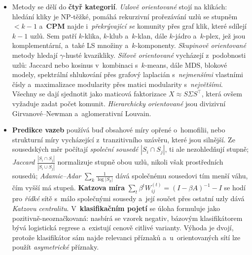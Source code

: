 \documentclass[11pt,a4paper]{article}
\theoremstyle{definition}
\begin{document}
\begin{itemize}
      lokální přesuny, pak stažení do supergrafu, celkem za $O(n\log n)$. Nevýhodou je citlivost
      na pořadí zpracování, možné \emph{nesouvislé komunity} a~uváznutí v~lokálních optimech.
      \textbf{Leiden} proto přidává fázi \emph{upřesnění rozdělení}, pořád ale dává jen tvrdé
      rozdělení. Otevřenou výzvou zůstává neznámý počet komunit a~heterogenní velikosti
      a~hustoty.
\item Metody se dělí do \textbf{čtyř kategorií}. \emph{Uzlově orientované} stojí na klikách:
      hledání kliky je NP-těžké, pomáhá rekurzivní prořezávání uzlů se stupněm $<k-1$
      a~\textbf{CPM} najde i~\emph{překrývající se} komunity přes graf klik, které sdílejí $k-1$
      uzlů. Sem patří $k$-klika, $k$-klub a~$k$-klan, dále $k$-jádro a~$k$-plex, jež jsou
      komplementární, a~také LS množiny a~$k$-komponenty. \emph{Skupinově orientované} metody
      hledají $\gamma$-husté kvazikliky. \emph{Síťově orientované} vycházejí z~podobnosti
      uzlů: Jaccard nebo kosinus v~kombinaci s~$k$-means, dále MDS, blokové modely,
      spektrální shlukování přes grafový laplacián s~\emph{nejmenšími} vlastními čísly
      a~maximalizace modularity přes matici modularity s~\emph{největšími}. Všechny se dají
      sjednotit jako maticová faktorizace $X\approx S\Sigma S^{\!\top}$, která ovšem vyžaduje
      zadat počet komunit. \emph{Hierarchicky orientované} jsou divizivní Girvanové--Newman
      a~aglomerativní Louvain.
\item \textbf{Predikce vazeb} používá buď obsahové míry opřené o~homofilii, nebo strukturní
      míry vycházející z~tranzitivního uzávěru, které jsou silnější. Ze sousedských měr počítají
      \emph{společní sousedé} $|S_i\cap S_j|$, ti ale nezohledňují stupně; \emph{Jaccard}
      $\frac{|S_i\cap S_j|}{|S_i\cup S_j|}$ normalizuje stupně obou uzlů, nikoli však
      prostředních sousedů; \emph{Adamic--Adar} $\sum_{k}\frac{1}{\log|S_k|}$ dává společnému
      sousedovi tím menší váhu, čím vyšší má stupeň. \textbf{Katzova míra}
      $\sum_t\beta^tW_{ij}^{(t)}=(I-\beta A)^{-1}-I$ se hodí pro \emph{řídké} sítě s~málo
      společnými sousedy a~její součet přes ostatní uzly dává \emph{Katzovu centralitu}.
      V~\textbf{klasifikačním pojetí} se úloha formuluje jako pozitivně-neoznačkovaná: nasbírá
      se vzorek negativ, bázovým klasifikátorem bývá logistická regrese a~existují cenově
      citlivé varianty. Výhoda je dvojí, protože klasifikátor sám najde relevanci příznaků
      a~u~orientovaných sítí lze použít \emph{asymetrické} příznaky.
\end{itemize}
\end{document}
